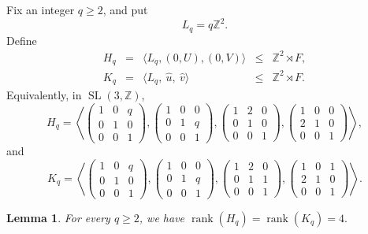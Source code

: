 \documentclass[]{amsart}
\newtheorem*{fixed point criterion}{\fixed point criterion}
\newtheorem{lem}[thm]{Lemma}
\theoremstyle{definition}
\theoremstyle{remark}
\numberwithin{equation}{section}
\newcommand{\SL}{\operatorname{SL}}
\newcommand{\Z}{\mathbb Z}
\newcommand{\rank}{\operatorname{rank}}
\begin{document}
Fix an integer $q\geq 2$, and put
\[
L_q=q\Z^2.
\]
Define
\begin{equation}\label{eq. Hq Kq}
\begin{array}{llcll}
H_q&=&\langle L_q,(0,U),(0,V)\rangle
&\leq& \Z^2\rtimes F,\\
K_q&=&\langle L_q, ~\hat u, ~\hat v\rangle
&\leq& \Z^2\rtimes F.
\end{array}
\end{equation}
Equivalently, in $\SL(3,\Z)$,
\[
H_q=
\left\langle
\begin{pmatrix}1&0&q\\0&1&0\\0&0&1\end{pmatrix},
\begin{pmatrix}1&0&0\\0&1&q\\0&0&1\end{pmatrix},
\begin{pmatrix}1&2&0\\0&1&0\\0&0&1\end{pmatrix},
\begin{pmatrix}1&0&0\\2&1&0\\0&0&1\end{pmatrix}
\right\rangle,
\]
and
\[
K_q=
\left\langle
\begin{pmatrix}1&0&q\\0&1&0\\0&0&1\end{pmatrix},
\begin{pmatrix}1&0&0\\0&1&q\\0&0&1\end{pmatrix},
\begin{pmatrix}1&2&0\\0&1&1\\0&0&1\end{pmatrix},
\begin{pmatrix}1&0&1\\2&1&0\\0&0&1\end{pmatrix}
\right\rangle.
\]

\begin{lem}
For every $q\geq 2$, we have $\rank(H_q)=\rank(K_q)=4.$
\end{lem}
\end{document}
